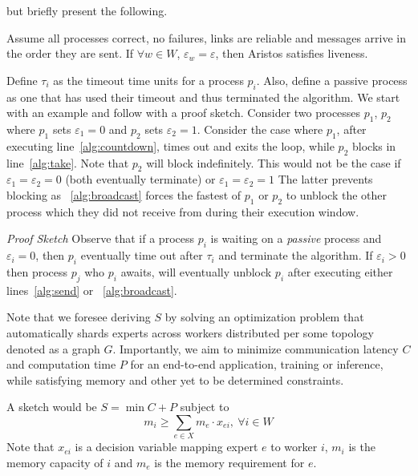 but briefly present the following.
\begin{theorem}\label{theo}
    Assume all processes correct, no failures, links are
    reliable and messages arrive in the order they are sent.
    If $\forall w \in W$, $\varepsilon_w = \varepsilon$, then Aristos satisfies liveness.
\end{theorem}
Define $\tau_i$ as the timeout time units for a process $p_i$.
Also, define a passive process as one that has used their timeout and thus terminated the algorithm.
We start with an example and follow with a proof sketch.
Consider two processes $p_1$, $p_2$ where $p_1$ sets $\varepsilon_1=0$ and $p_2$ sets $\varepsilon_2=1$.
Consider the case where $p_1$, after executing line~\ref{alg:countdown},
times out and exits the loop, while $p_2$ blocks in line~\ref{alg:take}.
Note that $p_2$ will block indefinitely.
This would not be the case if $\varepsilon_1=\varepsilon_2=0$
(both eventually terminate) or $\varepsilon_1=\varepsilon_2=1$
The latter prevents blocking as ~\ref{alg:broadcast} forces the fastest of $p_1$ or $p_2$ to unblock the other process
which they did not receive from during their execution window.

\noindent\emph{Proof Sketch} Observe that if a process $p_i$ is waiting on a \emph{passive}
process and $\varepsilon_i =0$, then $p_i$ eventually time out after $\tau_i$ and terminate the algorithm.
If $\varepsilon_i > 0$ then process $p_j$ who $p_i$ awaits, will eventually unblock $p_i$ after executing
either lines~\ref{alg:send} or ~\ref{alg:broadcast}.

Note that we foresee deriving $S$ by solving an optimization problem that automatically shards experts across
workers distributed per some topology denoted as a graph $G$.
Importantly, we aim to minimize communication latency $C$ and computation time $P$ for an end-to-end application,
training or inference, while satisfying memory and other yet to be determined constraints.

A sketch would be $ S = \min C + P$ subject to \[m_i \geq \sum_{e \in X} m_e \cdot x_{ei}, \> \forall i\in W\]
Note that $x_{ei}$ is a decision variable mapping expert $e$ to worker $i$, $m_i$ is the memory capacity of $i$ and
$m_e$ is the memory requirement for $e$.